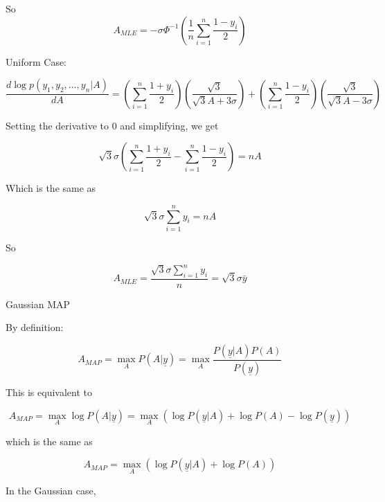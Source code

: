 \documentclass{amsart}
\begin{document}
So
\begin{equation}
A_{MLE} = -\sigma\Phi^{-1}\left(\frac{1}{n}\sum_{i=1}^{n}\frac{1-y_i}{2}\right)
\end{equation}


\newpage
Uniform Case:

\begin{equation}
\frac{d\log p(y_1, y_2, ..., y_n | A)}{dA} = \left(\sum_{i=1}^{n}\frac{1+y_i}{2}\right)\left( \frac{\sqrt{3}}{\sqrt{3}A + 3\sigma} \right) + \left(\sum_{i=1}^{n}\frac{1-y_i}{2}\right)\left( \frac{\sqrt{3}}{\sqrt{3}A - 3\sigma} \right)
\end{equation}

Setting the derivative to 0 and simplifying, we get

\begin{equation}
\sqrt{3}\sigma\left(\sum_{i=1}^{n}\frac{1+y_i}{2} - \sum_{i=1}^{n}\frac{1-y_i}{2}\right) = nA
\end{equation}

Which is the same as

\begin{equation}
\sqrt{3}\sigma\sum_{i=1}^{n}y_i = nA
\end{equation}

So

\begin{equation}
A_{MLE} = \frac{\sqrt{3}\sigma\sum_{i=1}^{n}y_i}{n} = \sqrt{3}\sigma\bar{y}
\end{equation}

\newpage

Gaussian MAP

By definition:

\begin{equation}
A_{MAP} = \max_{A} P(A|\underline{y}) = \max_{A}\frac{P(\underline{y}|A)P(A)}{P(\underline{y})}
\end{equation}

This is equivalent to 

\begin{equation}
A_{MAP} = \max_{A} \log P(A|\underline{y}) = \max_{A} \left( \log P(\underline{y}|A) + \log P(A) - \log P(\underline{y})\right)
\end{equation}

which is the same as 

\begin{equation}
A_{MAP} = \max_{A} \left( \log P(\underline{y}|A) + \log P(A)\right)
\end{equation}

In the Gaussian case, 
\end{document}

